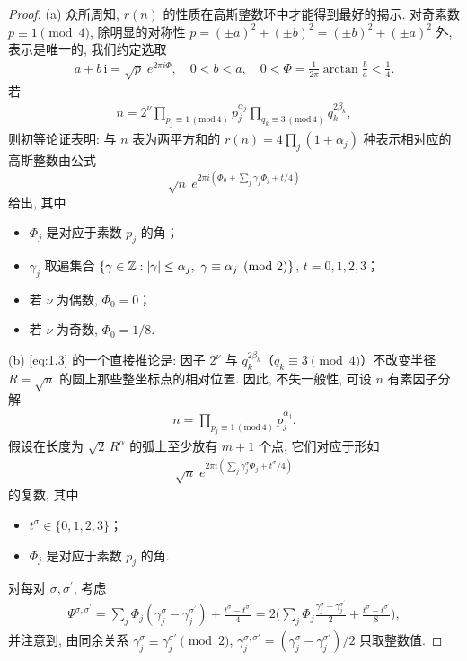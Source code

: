 \begin{proof}
(a) 众所周知, $r(n)$ 的性质在高斯整数环中才能得到最好的揭示. 对奇素数 $p \equiv 1 \pmod{4}$, 除明显的对称性 $p = (\pm a)^2 + (\pm b)^2 = (\pm b)^2 + (\pm a)^2$ 外, 表示是唯一的, 我们约定选取
\begin{align*}
  a+b\,\mathrm{i}=\sqrt{p}\;e^{2\pi i\Phi},\quad 0<b<a,\quad
  0<\Phi=\frac{1}{2\pi}\arctan\frac{b}{a}<\frac{1}{4}.
\end{align*}
若
\begin{align*}
  n=2^{\nu}\prod_{p_{j}\equiv 1\,(\mathrm{mod}\,4)}p_{j}^{\alpha_{j}}
  \prod_{q_{k}\equiv 3\,(\mathrm{mod}\,4)}q_{k}^{2\beta_{k}},
\end{align*}
则初等论证表明: 与 $n$ 表为两平方和的 $r(n) = 4 \prod_j (1 + \alpha_j)$ 种表示相对应的高斯整数由公式
\begin{equation}\label{eq:1.3}
  \sqrt{n}\:e^{2\pi i(\Phi_{0}+\sum_{j}\gamma_{j}\Phi_{j}+t/4)}
\end{equation}
给出, 其中
\begin{itemize}
\item $\Phi_{j}$ 是对应于素数 $p_{j}$ 的角；
\item $\gamma_j$ 取遍集合 $\{\gamma \in \mathbb{Z} : |\gamma| \leq \alpha_j,\ \gamma \equiv \alpha_j \pmod 2\}$, $t = 0, 1, 2, 3$；
\item 若 $\nu$ 为偶数, $\Phi_{0} = 0$；
\item 若 $\nu$ 为奇数, $\Phi_{0} = 1/8$.
\end{itemize}

(b) \eqref{eq:1.3} 的一个直接推论是: 因子 $2^{\nu}$ 与 $q_k^{2\beta_k}$（$q_k \equiv 3 \pmod 4$）不改变半径 $R = \sqrt{n}$ 的圆上那些整坐标点的相对位置. 因此, 不失一般性, 可设 $n$ 有素因子分解
\begin{align*}
  n=\prod_{p_{j}\equiv 1\,(\mathrm{mod}\,4)}p_{j}^{\alpha_{j}}.
\end{align*}
假设在长度为 $\sqrt{2}\,R^\alpha$ 的弧上至少放有 $m + 1$ 个点, 它们对应于形如
\begin{align*}
  \sqrt{n}\;e^{2\pi i(\sum_{j}\gamma_{j}^{\sigma}\Phi_{j}+t^{\sigma}/4)}
\end{align*}
的复数, 其中
\begin{itemize}
\item $t^{\sigma} \in \{0, 1, 2, 3\}$；
\item $\Phi_{j}$ 是对应于素数 $p_{j}$ 的角.
\end{itemize}
对每对 $\sigma, \sigma^{\prime}$, 考虑
\begin{align*}
  \Psi^{\sigma,\sigma^{\prime}}
  =\sum_{j}\Phi_{j}(\gamma_{j}^{\sigma}-\gamma_{j}^{\sigma^{\prime}})+\frac{t^{\sigma}-t^{\sigma^{\prime}}}{4}
  =2\Big(\sum_{j}\Phi_{j}\frac{\gamma_{j}^{\sigma}-\gamma_{j}^{\sigma^{\prime}}}{2}+\frac{t^{\sigma}-t^{\sigma^{\prime}}}{8}\Big),
\end{align*}
并注意到, 由同余关系 $\gamma_j^{\sigma} \equiv \gamma_j^{\sigma'} \pmod 2$, $\gamma_j^{\sigma,\sigma'} = (\gamma_j^{\sigma} - \gamma_j^{\sigma'})/2$ 只取整数值.


\end{proof}
